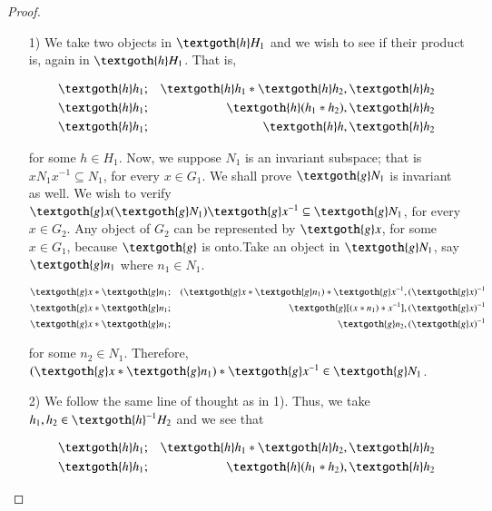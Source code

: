 \documentclass [12pt]{book}
\begin{document}
\begin{proof}\makebox[5pt][]{}\mbox {}

	\begin{itemize}

\item[1)] We take two objects in $\textgoth{h}H_{1}$ and we wish to see if their product is, again in $\textgoth{h}H_{1}$. That is,

\begin{eqnarray}\nonumber\textgoth{h}h_{1}&;&\textgoth{h}h_{1}
*\textgoth{h}h_{2},\textgoth{h}h_{2}\\\nonumber\textgoth{h}h_{1}&;&\textgoth{h}(h_{1}*h_{2}),\textgoth{h}h_{2}\\\nonumber\textgoth{h}h_{1}&;&\textgoth{h}h,\textgoth{h}h_{2}\end{eqnarray}

for some $h\in H_{1}$. Now, we suppose $N_{1}$ is an invariant subspace; that is $xN_{1}x^{-1}\subseteq N_{1}$, for every $x\in G_{1}$. We shall prove $\textgoth{g}N_{1}$ is invariant as well. We wish to verify $\textgoth{g}x(\textgoth{g}N_{1})\textgoth{g}x^{-1}\subseteq \textgoth{g}N_{1}$, for every $x\in G_{2}$. Any object of $G_{2}$ can be represented by $\textgoth{g}x$, for some $x\in G_{1}$, because $\textgoth{g}$ is onto.Take an object in $\textgoth{g}N_{1}$, say $\textgoth{g}n_{1}$ where $n_{1}\in N_{1}$. 

\begin{eqnarray}\nonumber \textgoth{g}x*\textgoth{g}n_{1}&;&(\textgoth{g}x*\textgoth{g}n_{1})
*\textgoth{g}x^{-1},(\textgoth{g}x)^{-1}\\\nonumber\textgoth {g}x*\textgoth{g}n_{1}&;&
\textgoth{g}[(x*n_{1})*x^{-1}],
(\textgoth{g}x)^{-1}\\\nonumber\textgoth{g}x*\textgoth{g}n_{1}&;&
\textgoth{g}n_{2},(\textgoth{g}x)^{-1}\end{eqnarray}

for some $n_{2}\in N_{1}$. Therefore, $(\textgoth{g}x*\textgoth{g}n_{1})*\textgoth{g}x^{-1}\in\textgoth{g}N_{1}$.

\item[2)] We follow the same line of thought as in 1). Thus, we take $h_{1},h_{2}\in\textgoth{h}^{-1}H_{2}$ and we see that

\begin{eqnarray}\nonumber \textgoth{h}h_{1}&;&\textgoth{h}h_{1}
*\textgoth{h}h_{2},\textgoth{h}h_{2}\\\nonumber \textgoth{h}h_{1}&;& \textgoth{h}(h_{1}*h_{2}),\textgoth{h}h_{2}\end{eqnarray}


\end{itemize}
\end{proof}
\end{document}
